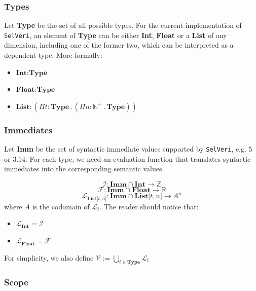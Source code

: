 \documentclass{article}
\begin{document}
\subsubsection{Types}

Let \textbf{Type} be the set of all possible types. For the current implementation of \texttt{SelVeri}, an element of \textbf{Type} can be either \textbf{Int}, \textbf{Float} or a \textbf{List} of any dimension, including one of the former two, which can be interpreted as a dependent type. More formally:

\begin{itemize}
    \item $\textbf{Int} : \textbf{Type}$ 
    \item $\textbf{Float} : \textbf{Type}$ 
    \item $ \textbf{List}: (\Pi{t} : \textbf{Type} \, . \,  (\Pi{n} : \textbf{$\mathbb{N}^+$} \, . \,  \textbf{Type}))$
\end{itemize}

\subsubsection{Immediates}

Let \textbf{Imm} be the set of syntactic immediate values supported by \texttt{SelVeri}, e.g. $5$ or  $3.14$. For each type, we need an evaluation function that translates syntactic immediates into the corresponding semantic values.

\[
\mathcal{I}: \textbf{Imm} \cap \textbf{Int} \rightarrow \mathbb{Z}
\]
\[
\mathcal{F}: \textbf{Imm} \cap \textbf{Float} \rightarrow \mathbb{R}
\]
\[
\mathcal{L}_{\textbf{List[$t, n$]}}: \textbf{Imm} \cap \textbf{List[$t, n$]} \rightarrow A^n 
\]
where $A$ is the codomain of $\mathcal{L}_t$. The reader should notice that:

\begin{itemize}
    \item $\mathcal{L}_\textbf{Int} = \mathcal{I}$
    \item $\mathcal{L}_\textbf{Float} = \mathcal{F}$
\end{itemize}

For simplicity, we also define $\mathcal{V} := \bigcup_{t \in \textbf{Type}} \mathcal{L}_t$

\subsubsection{Scope}
\end{document}
